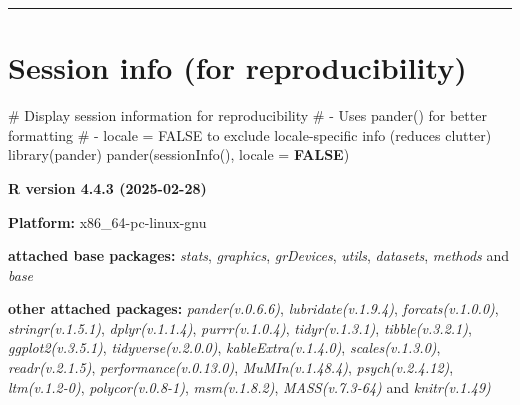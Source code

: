 \documentclass[
  bookmarksnumbered]{article}
\newenvironment{Shaded}{\begin{snugshade}}{\end{snugshade}}
\newcommand{\AttributeTok}[1]{\textcolor[rgb]{0.80,0.80,0.80}{#1}}
\newcommand{\CommentTok}[1]{\textcolor[rgb]{0.50,0.62,0.50}{#1}}
\newcommand{\ConstantTok}[1]{\textcolor[rgb]{0.86,0.64,0.64}{\textbf{#1}}}
\newcommand{\FunctionTok}[1]{\textcolor[rgb]{0.94,0.94,0.56}{#1}}
\newcommand{\NormalTok}[1]{\textcolor[rgb]{0.80,0.80,0.80}{#1}}
\begin{document}
\begin{center}\rule{0.5\linewidth}{0.5pt}\end{center}

\section{Session info (for reproducibility)}\label{session}

\begin{Shaded}
\begin{Highlighting}[]
\CommentTok{\# Display session information for reproducibility}
\CommentTok{\# {-} Uses \textasciigrave{}pander()\textasciigrave{} for better formatting}
\CommentTok{\# {-} \textasciigrave{}locale = FALSE\textasciigrave{} to exclude locale{-}specific info (reduces clutter)}
\FunctionTok{library}\NormalTok{(pander)}
\FunctionTok{pander}\NormalTok{(}\FunctionTok{sessionInfo}\NormalTok{(), }\AttributeTok{locale =} \ConstantTok{FALSE}\NormalTok{)}
\end{Highlighting}
\end{Shaded}

\textbf{R version 4.4.3 (2025-02-28)}

\textbf{Platform:} x86\_64-pc-linux-gnu

\textbf{attached base packages:}
\emph{stats}, \emph{graphics}, \emph{grDevices}, \emph{utils}, \emph{datasets}, \emph{methods} and \emph{base}

\textbf{other attached packages:}
\emph{pander(v.0.6.6)}, \emph{lubridate(v.1.9.4)}, \emph{forcats(v.1.0.0)}, \emph{stringr(v.1.5.1)}, \emph{dplyr(v.1.1.4)}, \emph{purrr(v.1.0.4)}, \emph{tidyr(v.1.3.1)}, \emph{tibble(v.3.2.1)}, \emph{ggplot2(v.3.5.1)}, \emph{tidyverse(v.2.0.0)}, \emph{kableExtra(v.1.4.0)}, \emph{scales(v.1.3.0)}, \emph{readr(v.2.1.5)}, \emph{performance(v.0.13.0)}, \emph{MuMIn(v.1.48.4)}, \emph{psych(v.2.4.12)}, \emph{ltm(v.1.2-0)}, \emph{polycor(v.0.8-1)}, \emph{msm(v.1.8.2)}, \emph{MASS(v.7.3-64)} and \emph{knitr(v.1.49)}
\end{document}
